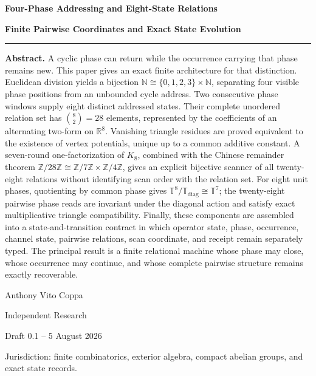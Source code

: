 \documentclass[11pt,letterpaper]{article}
\theoremstyle{relationstyle}
\newcommand{\R}{\mathbb{R}}
\newcommand{\N}{\mathbb{N}}
\newcommand{\Z}{\mathbb{Z}}
\newcommand{\T}{\mathbb{T}}
\newcommand{\diagT}{\T_{\mathrm{diag}}}
\begin{document}
\hypersetup{pageanchor=false}

\begin{titlepage}
\thispagestyle{empty}
\vspace*{0.09\textheight}

{\fontsize{28}{33}\selectfont\bfseries\color{onyx} Four-Phase Addressing and Eight-State Relations\par}
\vspace{0.75em}
{\fontsize{17}{22}\selectfont\bfseries Finite Pairwise Coordinates and Exact State Evolution\par}

\vspace{2.0em}
\color{gold}\rule{0.62\textwidth}{1.1pt}\color{black}
\vspace{1.9em}

\begin{abstractbox}
\textbf{Abstract.}
A cyclic phase can return while the occurrence carrying that phase remains new.  This paper gives an exact finite architecture for that distinction.  Euclidean division yields a bijection $\N\cong\{0,1,2,3\}\times\N$, separating four visible phase positions from an unbounded cycle address.  Two consecutive phase windows supply eight distinct addressed states.  Their complete unordered relation set has $\binom82=28$ elements, represented by the coefficients of an alternating two-form on $\R^8$.  Vanishing triangle residues are proved equivalent to the existence of vertex potentials, unique up to a common additive constant.  A seven-round one-factorization of $K_8$, combined with the Chinese remainder theorem $\Z/28\Z\cong\Z/7\Z\times\Z/4\Z$, gives an explicit bijective scanner of all twenty-eight relations without identifying scan order with the relation set.  For eight unit phases, quotienting by common phase gives $\T^8/\diagT\cong\T^7$; the twenty-eight pairwise phase reads are invariant under the diagonal action and satisfy exact multiplicative triangle compatibility.  Finally, these components are assembled into a state-and-transition contract in which operator state, phase, occurrence, channel state, pairwise relations, scan coordinate, and receipt remain separately typed.  The principal result is a finite relational machine whose phase may close, whose occurrence may continue, and whose complete pairwise structure remains exactly recoverable.
\end{abstractbox}

\vfill
{\large Anthony Vito Coppa\par}
{\large Independent Research\par}
{\large Draft 0.1 -- 5 August 2026\par}
\vspace{0.6em}
{\small Jurisdiction: finite combinatorics, exterior algebra, compact abelian groups, and exact state records.\par}
\end{titlepage}
\hypersetup{pageanchor=true}
\end{document}
